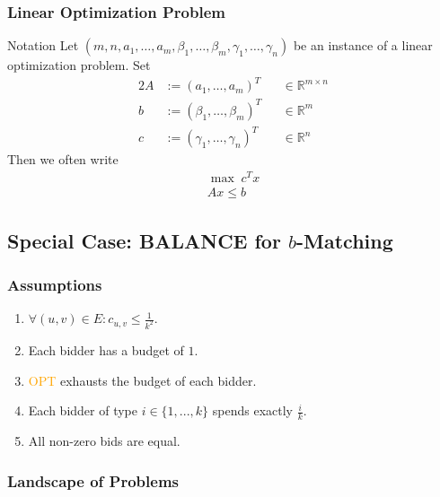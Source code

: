 \begin{frame}
    \frametitle{Linear Optimization Problem}
    \begin{block}{Notation}
        Let $(m, n, a_1, \dots, a_m, \beta_1, \dots, \beta_m, \gamma_1, \dots, \gamma_n)$ be an instance of a linear optimization problem.
        Set
        \begin{alignat*}{2}
            A & := (a_1, \dots, a_m)^T & & \in \mathbb{R}^{m \times n} \\
            b & := (\beta_1, \dots, \beta_m)^T & & \in \mathbb{R}^m \\
            c & := (\gamma_1, \dots, \gamma_n)^T & & \in \mathbb{R}^n
        \end{alignat*}
        Then we often write
        \begin{gather*}
            \max \; c^T x \\
            Ax \leq b
        \end{gather*}
    \end{block}
\end{frame}

\subsection{Special Case: BALANCE for $b$-Matching}

\begin{frame}
    \frametitle{Assumptions}
	\begin{enumerate}
        \item<1-> $\forall (u,v) \in E: c_{u,v} \leq \frac{1}{k^2}$.
        \item<1-> Each bidder has a budget of $1$.
        \item<1-> \textcolor{orange}{OPT} exhausts the budget of each bidder.
        \item<1-> Each bidder of type $i \in \{1,...,k \}$ spends exactly $\frac{i}{k}$.
        \item<1-> All non-zero bids are equal.
	\end{enumerate}
\end{frame}

\begin{frame}
    \frametitle{Landscape of Problems}
    \centering
\end{frame}


